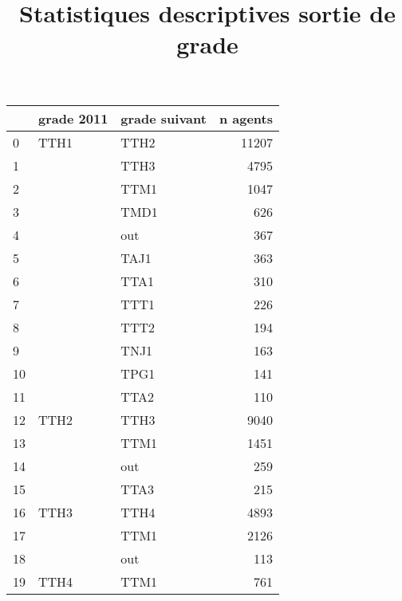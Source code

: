 \documentclass[11pt,a4paper]{article}
\begin{document}
\title{Statistiques descriptives sortie de grade}

\begin{tabular}{lllr}
	\toprule
	{} & grade 2011 & grade suivant &  n agents \\
	\midrule
	0  &       TTH1 &       TTH2 &  11207 \\
	1  &        &       TTH3 &   4795 \\
	2  &        &       TTM1 &   1047 \\
	3  &        &       TMD1 &    626 \\
	4  &        &        out &    367 \\
	5  &        &       TAJ1 &    363 \\
	6  &        &       TTA1 &    310 \\
	7  &        &       TTT1 &    226 \\
	8  &        &       TTT2 &    194 \\
	9  &        &       TNJ1 &    163 \\
	10 &        &       TPG1 &    141 \\
	11 &        &       TTA2 &    110 \\
	12 &       TTH2 &       TTH3 &   9040 \\
	13 &        &       TTM1 &   1451 \\
	14 &        &        out &    259 \\
	15 &        &       TTA3 &    215 \\
	16 &       TTH3 &       TTH4 &   4893 \\
	17 &        &       TTM1 &   2126 \\
	18 &        &        out &    113 \\
	19 &       TTH4 &       TTM1 &    761 \\
	\bottomrule
\end{tabular}


\author{}


\maketitle

\end{document}
